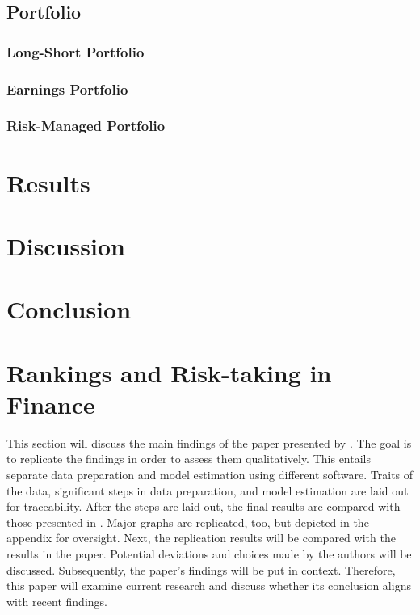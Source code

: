\documentclass[12pt]{article}
\begin{document}
\subsection{Portfolio} \label{subsection:Portfolio}

\subsubsection{Long-Short Portfolio} \label{subsubsection:LS_portfolio}

\subsubsection{Earnings Portfolio} \label{subsubsection:EP}

\subsubsection{Risk-Managed Portfolio} \label{subsubsection:rmport}


\section{Results} \label{section:Results}

\section{Discussion} \label{section:Discussion}

\section{Conclusion} \label{section:Conclusion}




\section{Rankings and Risk-taking in Finance} \label{section:rankings}
This section will discuss the main findings of the paper presented by \textcite{Kirchler2018}. The goal is to replicate the findings in order to assess them qualitatively. This entails separate data preparation and model estimation using different software.
Traits of the data, significant steps in data preparation, and model estimation are laid out for traceability. After the steps are laid out, the final results are compared with those presented in \textcite{Kirchler2018}. Major graphs are replicated, too, but depicted in the appendix for oversight.
Next, the replication results will be compared with the results in the paper. Potential deviations and choices made by the authors will be discussed. Subsequently, the paper's findings will be put in context. Therefore, this paper will examine current research and discuss whether its conclusion aligns with recent findings.
\end{document}
